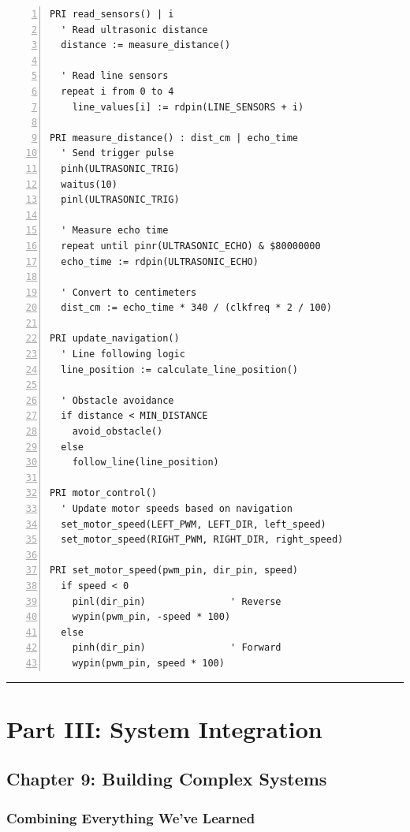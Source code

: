 \documentclass[11pt,a4paper,oneside,english]{book}
\begin{document}
\begin{Spin2Block}
\begin{Verbatim}[numbers=left,numbersep=5pt,xleftmargin=15pt]
PRI read_sensors() | i
  ' Read ultrasonic distance
  distance := measure_distance()
  
  ' Read line sensors
  repeat i from 0 to 4
    line_values[i] := rdpin(LINE_SENSORS + i)

PRI measure_distance() : dist_cm | echo_time
  ' Send trigger pulse
  pinh(ULTRASONIC_TRIG)
  waitus(10)
  pinl(ULTRASONIC_TRIG)
  
  ' Measure echo time
  repeat until pinr(ULTRASONIC_ECHO) & $80000000
  echo_time := rdpin(ULTRASONIC_ECHO)
  
  ' Convert to centimeters
  dist_cm := echo_time * 340 / (clkfreq * 2 / 100)

PRI update_navigation()
  ' Line following logic
  line_position := calculate_line_position()
  
  ' Obstacle avoidance
  if distance < MIN_DISTANCE
    avoid_obstacle()
  else
    follow_line(line_position)

PRI motor_control()
  ' Update motor speeds based on navigation
  set_motor_speed(LEFT_PWM, LEFT_DIR, left_speed)
  set_motor_speed(RIGHT_PWM, RIGHT_DIR, right_speed)

PRI set_motor_speed(pwm_pin, dir_pin, speed)
  if speed < 0
    pinl(dir_pin)               ' Reverse
    wypin(pwm_pin, -speed * 100)
  else
    pinh(dir_pin)               ' Forward
    wypin(pwm_pin, speed * 100)
\end{Verbatim}
\end{Spin2Block}

\begin{center}\rule{0.5\linewidth}{0.5pt}\end{center}

\clearpage

\clearpage

\hypertarget{part-iii-system-integration}{%
\part{Part III: System Integration}\label{part-iii-system-integration}}

\hypertarget{chapter-9-building-complex-systems}{%
\chapter{Chapter 9: Building Complex
Systems}\label{chapter-9-building-complex-systems}}

\hypertarget{combining-everything-weve-learned}{%
\section{Combining Everything We've
Learned}\label{combining-everything-weve-learned}}
\end{document}
